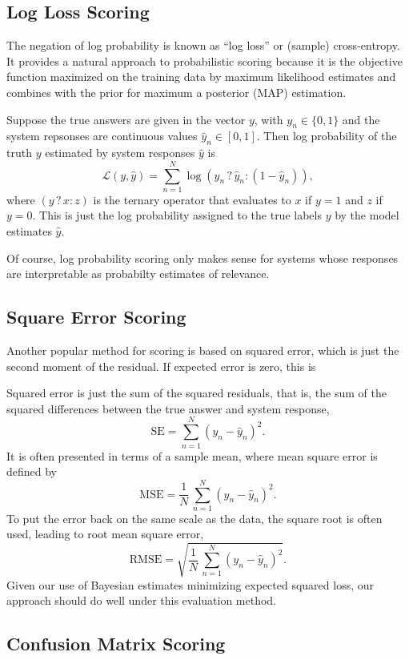 \documentclass{article}
\begin{document}
\subsection{Log Loss Scoring}\label{log-loss-sec}

The negation of log probability is known as ``log loss'' or (sample)
cross-entropy.  It provides a natural approach to probabilistic
scoring because it is the objective function maximized on the
training data by maximum likelihood estimates and combines with the
prior for maximum a posterior (MAP) estimation.

Suppose the true answers are given in the vector
$y$, with $y_n \in \{ 0, 1 \}$ and the system repsonses are continuous
values $\hat{y}_n \in [0,1]$.  Then log probability of the truth 
$y$ estimated by system responses $\hat{y}$ is
%
\[
{\mathcal L}(y,\hat{y})  = \sum_{n=1}^N \log (y_n \, ? \, \hat{y}_n : (1 - \hat{y}_n)),
\]
%
where $(y \, ? \, x : z)$ is the ternary operator that evaluates to $x$ if $y
= 1$ and $z$ if $y = 0$.  This is just the log probability assigned to
the true labels $y$ by the model estimates $\hat{y}$.

Of course, log probability scoring only makes sense for
systems whose responses are interpretable as probabilty estimates of
relevance.

\subsection{Square Error Scoring}

Another popular method for scoring is based on squared error, which is
just the second moment of the residual.  If expected error is zero,
this
is 

Squared
error is just the sum of the squared residuals, that is, the sum
of the squared differences between the true answer and system response,
%
\[
\mbox{SE} = \sum_{n=1}^N (y_n - \hat{y}_n)^2.
\]
%
It is often presented in terms of a sample mean, where mean square
error is defined by
\[
\mbox{MSE} = \frac{1}{N} \, \sum_{n=1}^N (y_n - \hat{y}_n)^2.
\]
%
To put the error back on the same scale as the data, the square root
is often used, leading to root mean square error,
\[
\mbox{RMSE} = \sqrt{\frac{1}{N} \, \sum_{n=1}^N (y_n - \hat{y}_n)^2}.
\]
%
Given our use of Bayesian estimates minimizing expected squared loss,
our approach should do well under this evaluation method.


\subsection{Confusion Matrix Scoring}\label{confusion-matrix-eval-sec}
\end{document}
